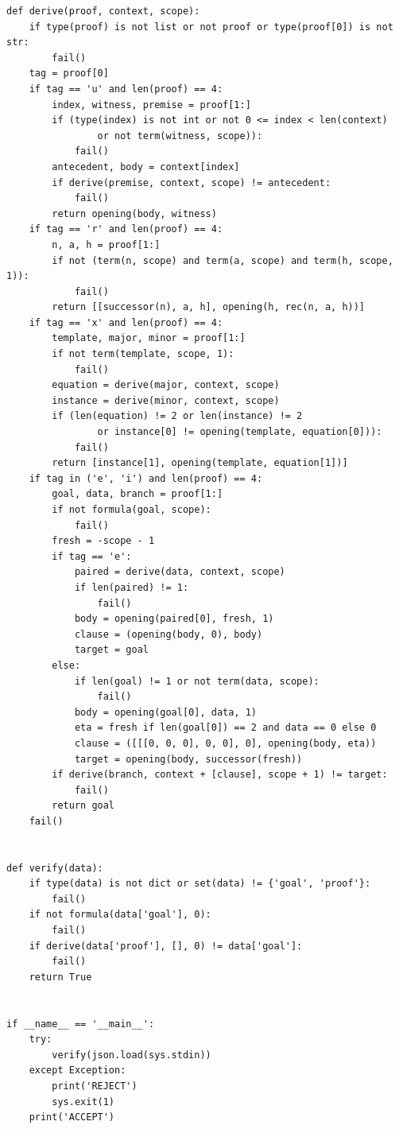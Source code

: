 \documentclass[11pt,letterpaper]{article}
\theoremstyle{definition}\newtheorem{definition}[theorem]{Definition}
\begin{document}
\begin{lstlisting}
def derive(proof, context, scope):
    if type(proof) is not list or not proof or type(proof[0]) is not str:
        fail()
    tag = proof[0]
    if tag == 'u' and len(proof) == 4:
        index, witness, premise = proof[1:]
        if (type(index) is not int or not 0 <= index < len(context)
                or not term(witness, scope)):
            fail()
        antecedent, body = context[index]
        if derive(premise, context, scope) != antecedent:
            fail()
        return opening(body, witness)
    if tag == 'r' and len(proof) == 4:
        n, a, h = proof[1:]
        if not (term(n, scope) and term(a, scope) and term(h, scope, 1)):
            fail()
        return [[successor(n), a, h], opening(h, rec(n, a, h))]
    if tag == 'x' and len(proof) == 4:
        template, major, minor = proof[1:]
        if not term(template, scope, 1):
            fail()
        equation = derive(major, context, scope)
        instance = derive(minor, context, scope)
        if (len(equation) != 2 or len(instance) != 2
                or instance[0] != opening(template, equation[0])):
            fail()
        return [instance[1], opening(template, equation[1])]
    if tag in ('e', 'i') and len(proof) == 4:
        goal, data, branch = proof[1:]
        if not formula(goal, scope):
            fail()
        fresh = -scope - 1
        if tag == 'e':
            paired = derive(data, context, scope)
            if len(paired) != 1:
                fail()
            body = opening(paired[0], fresh, 1)
            clause = (opening(body, 0), body)
            target = goal
        else:
            if len(goal) != 1 or not term(data, scope):
                fail()
            body = opening(goal[0], data, 1)
            eta = fresh if len(goal[0]) == 2 and data == 0 else 0
            clause = ([[[0, 0, 0], 0, 0], 0], opening(body, eta))
            target = opening(body, successor(fresh))
        if derive(branch, context + [clause], scope + 1) != target:
            fail()
        return goal
    fail()


def verify(data):
    if type(data) is not dict or set(data) != {'goal', 'proof'}:
        fail()
    if not formula(data['goal'], 0):
        fail()
    if derive(data['proof'], [], 0) != data['goal']:
        fail()
    return True


if __name__ == '__main__':
    try:
        verify(json.load(sys.stdin))
    except Exception:
        print('REJECT')
        sys.exit(1)
    print('ACCEPT')
\end{lstlisting}
\begingroup\small
\end{document}
